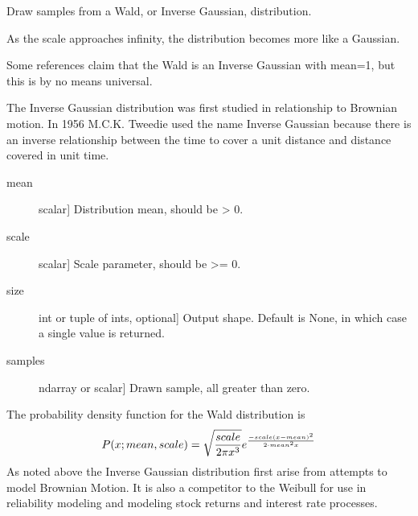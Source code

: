 \documentclass[letterpaper,10pt,english]{sphinxmanual}
\begin{document}

\begin{fulllineitems}
\label{pygeomod:pygeomod.geomodeller_xml_obj.wald}
Draw samples from a Wald, or Inverse Gaussian, distribution.

As the scale approaches infinity, the distribution becomes more like a
Gaussian.

Some references claim that the Wald is an Inverse Gaussian with mean=1, but
this is by no means universal.

The Inverse Gaussian distribution was first studied in relationship to
Brownian motion. In 1956 M.C.K. Tweedie used the name Inverse Gaussian
because there is an inverse relationship between the time to cover a unit
distance and distance covered in unit time.
\begin{description}
\item[{mean}] \leavevmode{[}scalar{]}
Distribution mean, should be \textgreater{} 0.

\item[{scale}] \leavevmode{[}scalar{]}
Scale parameter, should be \textgreater{}= 0.

\item[{size}] \leavevmode{[}int or tuple of ints, optional{]}
Output shape. Default is None, in which case a single value is
returned.

\end{description}
\begin{description}
\item[{samples}] \leavevmode{[}ndarray or scalar{]}
Drawn sample, all greater than zero.

\end{description}

The probability density function for the Wald distribution is
\begin{gather}
\begin{split}P(x;mean,scale) = \sqrt{\frac{scale}{2\pi x^3}}e^
\frac{-scale(x-mean)^2}{2\cdotp mean^2x}\end{split}\notag
\end{gather}
As noted above the Inverse Gaussian distribution first arise from attempts
to model Brownian Motion. It is also a competitor to the Weibull for use in
reliability modeling and modeling stock returns and interest rate
processes.


\end{fulllineitems}
\end{document}
